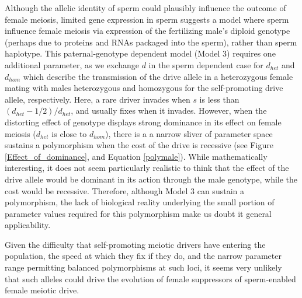 \documentclass[12pt,letterpaper]{article}
\begin{document}
Although the allelic identity of sperm could plausibly influence the outcome of female meiosis, 
	limited gene expression in sperm \citep[e.g.][]{Joseph2004}
	suggests a model where sperm influence female meiosis via expression of the fertilizing male's
	diploid genotype (perhaps due to proteins and RNAs packaged into the sperm), rather than sperm haplotype.
This paternal-genotype dependent model (Model 3) requires one additional parameter, as we exchange $d$ in the sperm dependent case for $d_{het}$ and $d_{hom}$ which describe the transmission of the drive allele in a heterozygous female mating with males heterozygous and homozygous for the self-promoting drive allele, respectively.  
Here, a rare driver invades when $s$ is less than $(d_{het}-1/2)/d_{het}$, and usually fixes when it invades.
However, when the distorting effect of genotype displays strong dominance in its
	effect on female meiosis ($d_{het}$ is close to $d_{hom}$), 
	there is a a narrow sliver of parameter space sustains a polymorphism
	when the cost of the drive is recessive
	(see Figure \ref{Effect_of_dominance}, and Equation \ref{polymale}).  
While mathematically interesting, it does not seem particularly realistic to think that the
	effect of the drive allele would be dominant in its action through the
	male genotype, while the cost would be recessive. 
Therefore, although Model 3 can sustain a polymorphism, 
	the lack of biological reality underlying the small portion of parameter values 
	required for this polymorphism make us doubt it general applicability. 


Given the difficulty that self-promoting meiotic drivers have entering the population, the speed at
which they fix if they do, and the narrow parameter range permitting balanced polymorphisms at such loci,  
it seems very unlikely that such alleles could drive the evolution of female suppressors of sperm-enabled
female meiotic drive.
\end{document}
